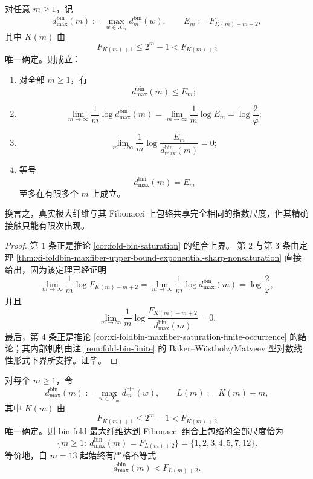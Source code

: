 \begin{theorem}\label{thm:conclusion-foldbin-fibonacci-upper-envelope-finite-contact}
对任意 \(m\ge 1\)，记
\[
d_{\max}^{\mathrm{bin}}(m):=\max_{w\in X_m}d_m^{\mathrm{bin}}(w),
\qquad
E_m:=F_{K(m)-m+2},
\]
其中 \(K(m)\) 由
\[
F_{K(m)+1}\le 2^m-1<F_{K(m)+2}
\]
唯一确定。则成立：
\begin{enumerate}
  \item 对全部 \(m\ge 1\)，有
  \[
  d_{\max}^{\mathrm{bin}}(m)\le E_m;
  \]
  \item
  \[
  \lim_{m\to\infty}\frac1m\log d_{\max}^{\mathrm{bin}}(m)
  =
  \lim_{m\to\infty}\frac1m\log E_m
  =
  \log\frac{2}{\varphi};
  \]
  \item
  \[
  \lim_{m\to\infty}\frac1m\log\frac{E_m}{d_{\max}^{\mathrm{bin}}(m)}=0;
  \]
  \item 等号
  \[
  d_{\max}^{\mathrm{bin}}(m)=E_m
  \]
  至多在有限多个 \(m\) 上成立。
\end{enumerate}
换言之，真实极大纤维与其 Fibonacci 上包络共享完全相同的指数尺度，但其精确接触只能有限次出现。
\end{theorem}

\begin{proof}
第 \(1\) 条正是推论 \ref{cor:fold-bin-saturation} 的组合上界。
第 \(2\) 与第 \(3\) 条由定理 \ref{thm:xi-foldbin-maxfiber-upper-bound-exponential-sharp-nonsaturation} 直接给出，因为该定理已经证明
\[
\lim_{m\to\infty}\frac1m\log F_{K(m)-m+2}
=
\lim_{m\to\infty}\frac1m\log d_{\max}^{\mathrm{bin}}(m)
=
\log\frac{2}{\varphi},
\]
并且
\[
\lim_{m\to\infty}\frac1m\log\frac{F_{K(m)-m+2}}{d_{\max}^{\mathrm{bin}}(m)}=0.
\]
最后，第 \(4\) 条正是推论 \ref{cor:xi-foldbin-maxfiber-saturation-finite-occurrence} 的结论；其内部机制由注 \ref{rem:fold-bin-finite} 的 Baker--W\"ustholz/Matveev 型对数线性形式下界所支撑。证毕。
\end{proof}

\begin{conjecture}\label{conj:conclusion-foldbin-fibonacci-envelope-complete-saturation-set}
对每个 \(m\ge 1\)，令
\[
d_{\max}^{\mathrm{bin}}(m):=\max_{w\in X_m}d_m^{\mathrm{bin}}(w),
\qquad
L(m):=K(m)-m,
\]
其中 \(K(m)\) 由
\[
F_{K(m)+1}\le 2^m-1<F_{K(m)+2}
\]
唯一确定。则 bin-fold 最大纤维达到 Fibonacci 组合上包络的全部尺度恰为
\[
\bigl\{m\ge 1:\ d_{\max}^{\mathrm{bin}}(m)=F_{L(m)+2}\bigr\}
=
\{1,2,3,4,5,7,12\}.
\]
等价地，自 \(m=13\) 起始终有严格不等式
\[
d_{\max}^{\mathrm{bin}}(m)<F_{L(m)+2}.
\]
\end{conjecture}

